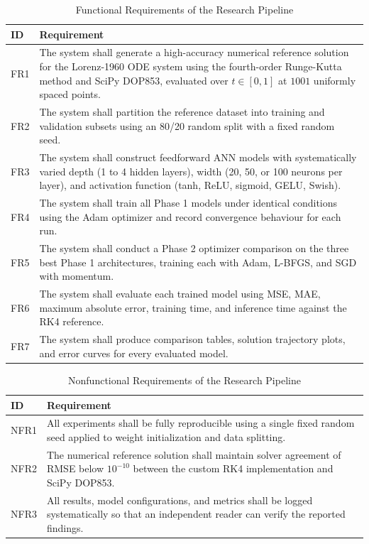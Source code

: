 \begin{table}[H]
\centering
\caption{Functional Requirements of the Research Pipeline}
\label{tab:fr}
\renewcommand{\arraystretch}{1.2}
\begin{tabular}{|p{1.2cm}|p{12.5cm}|}
\hline
\textbf{ID} & \textbf{Requirement} \\
\hline
FR1 & The system shall generate a high-accuracy numerical reference solution for the Lorenz-1960 ODE system using the fourth-order Runge-Kutta method and SciPy DOP853, evaluated over $t \in [0, 1]$ at $1001$ uniformly spaced points. \\
\hline
FR2 & The system shall partition the reference dataset into training and validation subsets using an 80/20 random split with a fixed random seed. \\
\hline
FR3 & The system shall construct feedforward ANN models with systematically varied depth (1 to 4 hidden layers), width (20, 50, or 100 neurons per layer), and activation function (tanh, ReLU, sigmoid, GELU, Swish). \\
\hline
FR4 & The system shall train all Phase 1 models under identical conditions using the Adam optimizer and record convergence behaviour for each run. \\
\hline
FR5 & The system shall conduct a Phase 2 optimizer comparison on the three best Phase 1 architectures, training each with Adam, L-BFGS, and SGD with momentum. \\
\hline
FR6 & The system shall evaluate each trained model using MSE, MAE, maximum absolute error, training time, and inference time against the RK4 reference. \\
\hline
FR7 & The system shall produce comparison tables, solution trajectory plots, and error curves for every evaluated model. \\
\hline
\end{tabular}
\end{table}

\begin{table}[H]
\centering
\caption{Nonfunctional Requirements of the Research Pipeline}
\label{tab:nfr}
\renewcommand{\arraystretch}{1.2}
\begin{tabular}{|p{1.5cm}|p{12.2cm}|}
\hline
\textbf{ID} & \textbf{Requirement} \\
\hline
NFR1 & All experiments shall be fully reproducible using a single fixed random seed applied to weight initialization and data splitting. \\
\hline
NFR2 & The numerical reference solution shall maintain solver agreement of RMSE below $10^{-10}$ between the custom RK4 implementation and SciPy DOP853. \\
\hline
NFR3 & All results, model configurations, and metrics shall be logged systematically so that an independent reader can verify the reported findings. \\
\hline
\end{tabular}
\end{table}

